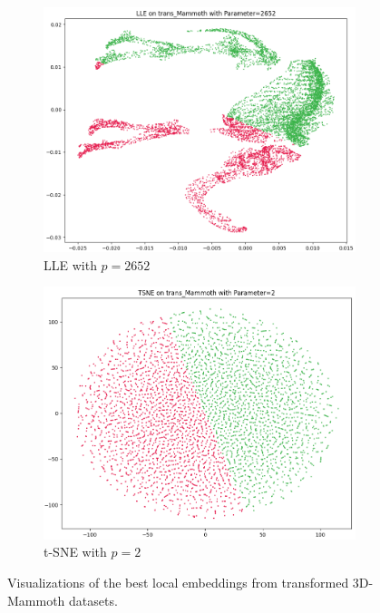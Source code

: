 \begin{figure}[!]
     \centering
     \begin{subfigure}[t]{0.49\columnwidth}
    	\centering
    	\includegraphics[width=\columnwidth]{images/LOW_trans_Mammoth_lle2652_Kmeans2.png}
    	\caption{LLE with $p=2652$}
        \label{fig:LOW_trans_Mammoth_lle2652_Kmeans2}
    \end{subfigure}
     \hfill
     \begin{subfigure}[t]{0.49\columnwidth}
    	\centering
    	\includegraphics[width=\columnwidth]{images/LOW_trans_Mammoth_tsne2_Kmeans2.png}
    	\caption{t-SNE with $p=2$}
        \label{fig:LOW_trans_Mammoth_tsne2_Kmeans2}
    \end{subfigure}
     \caption[Best Local Transformed Mammoth Clustering]{Visualizations of the best local embeddings from transformed 3D-Mammoth datasets.}
    \label{fig:best_local_trans_mammoth_clu}
\end{figure}

